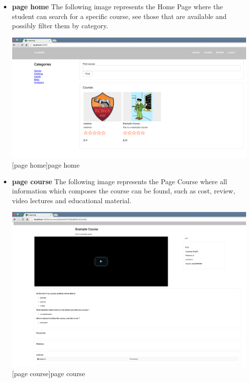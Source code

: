 \begin{itemize}

\item \textbf{page home} The following image represents the Home Page where the student can search for a specific course, see those that are available and possibly filter them by category.\par

\begin{minipage}{\linewidth}
    \centering
    \includegraphics[width=1.0\linewidth]{images/chapter4/page-home.png}
    [page home]{page home}
\end{minipage}


\item \textbf{page course} The following image represents the Page Course where all information which composes the course can be found, such as cost, review, video lectures and educational material.\par
\begin{minipage}{\linewidth}
    \centering
    \includegraphics[width=1.0\linewidth]{images/chapter4/page-course.png}
    [page course]{page course}
\end{minipage}



\end{itemize}
